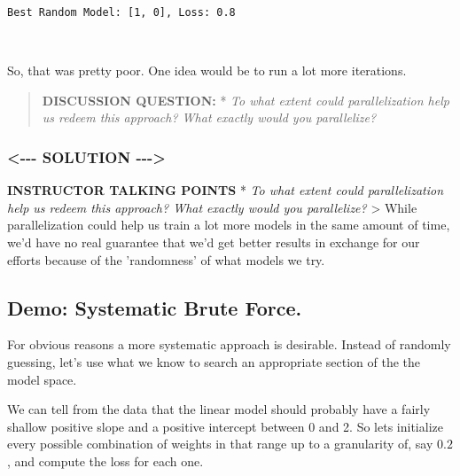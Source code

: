 \documentclass[11pt]{article}
\begin{document}
    \begin{Verbatim}[commandchars=\\\{\}]
Best Random Model: [1, 0], Loss: 0.8

    \end{Verbatim}

    \begin{center}
    \end{center}
    { \hspace*{\fill} \\}
    
    So, that was pretty poor. One idea would be to run a lot more
iterations.

\begin{quote}
\textbf{DISCUSSION QUESTION:} * \emph{To what extent could
parallelization help us redeem this approach? What exactly would you
parallelize?}
\end{quote}

    \subsubsection{\textless{}-\/-\/- SOLUTION
-\/-\/-\textgreater{}}\label{solution----}

\textbf{INSTRUCTOR TALKING POINTS} * \emph{To what extent could
parallelization help us redeem this approach? What exactly would you
parallelize?} \textgreater{} While parallelization could help us train a
lot more models in the same amount of time, we'd have no real guarantee
that we'd get better results in exchange for our efforts because of the
'randomness' of what models we try.

    \subsection{Demo: Systematic Brute
Force.}\label{demo-systematic-brute-force.}

    For obvious reasons a more systematic approach is desirable. Instead of
randomly guessing, let's use what we know to search an appropriate
section of the the model space.

We can tell from the data that the linear model should probably have a
fairly shallow positive slope and a positive intercept between 0 and 2.
So lets initialize every possible combination of weights in that range
up to a granularity of, say \(0.2\), and compute the loss for each one.
\end{document}
